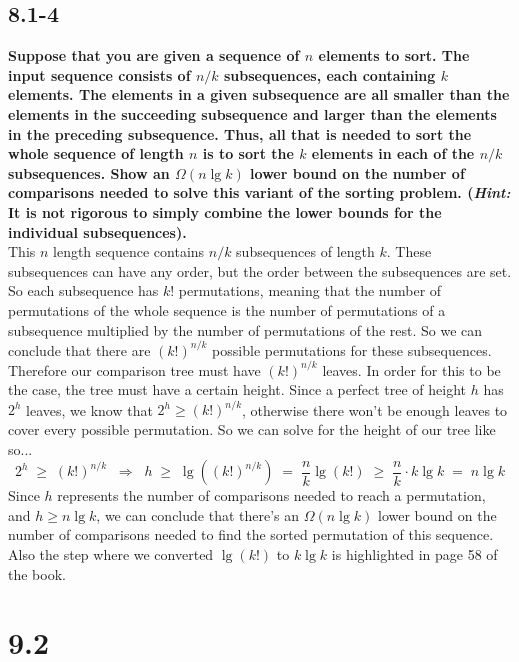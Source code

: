 \documentclass[11pt]{article}
\begin{document}
 \subsection*{8.1-4}
 \textbf{Suppose that you are given a sequence of $n$ elements to sort. The input sequence 
 consists of $n/k$ subsequences, each containing $k$ elements. The elements in a given 
 subsequence are all smaller than the elements in the succeeding subsequence and larger than 
 the elements in the preceding subsequence. Thus, all that is needed to sort the whole 
 sequence of length $n$ is to sort the $k$ elements in each of the $n/k$ subsequences. Show 
 an $\Omega(n \lg k)$ lower bound on the number of comparisons needed to solve this variant 
 of the sorting problem. (\textit{Hint:} It is not rigorous to simply combine the lower bounds 
 for the individual subsequences).} \\

 This $n$ length sequence contains $n/k$ subsequences of length $k$.  These subsequences can have 
 any order, but the order between the subsequences are set.  So each subsequence has $k!$ 
 permutations, meaning that the number of permutations of the whole sequence is the number of 
 permutations of a subsequence multiplied by the number of permutations of the rest.  So we can 
 conclude that there are $(k!)^{n/k}$ possible permutations for these subsequences.  Therefore 
 our comparison tree must have $(k!)^{n/k}$ leaves.  In order for this to be the case, the tree 
 must have a certain height.  Since a perfect tree of height $h$ has $2^h$ leaves, we know that 
 $2^h \geq (k!)^{n/k}$, otherwise there won't be enough leaves to cover every possible permutation. 
 So we can solve for the height of our tree like so... 
 $$2^h \;\geq\; (k!)^{n/k} \;\;\Rightarrow\;\; h \;\geq\; \lg ((k!)^{n/k}) \;=\; \frac{n}{k} \lg (k!)
 \;\geq\; \frac{n}{k} \cdot k \lg k \;=\; n \lg k$$
 Since $h$ represents the number of comparisons needed to reach a permutation, and $h \geq n \lg k$, 
 we can conclude that there's an $\Omega(n \lg k)$ lower bound on the number of comparisons needed to 
 find the sorted permutation of this sequence.  Also the step where we converted $\lg (k!)$ to $k \lg k$
 is highlighted in page 58 of the book.
 \newpage

 \section*{9.2}
\end{document}
